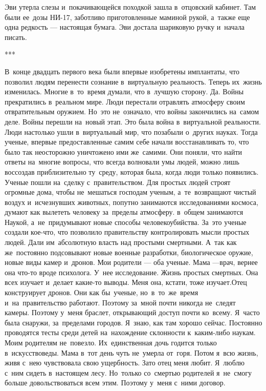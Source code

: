 Эви утерла слезы и~покачивающейся походкой зашла в~отцовский кабинет.
Там были ее~дозы НИ-17, заботливо приготовленные маминой рукой, а~также еще одна редкость --- настоящая бумага.
Эви достала шариковую ручку и~начала писать.
 
 \begin{center}
 	***
 \end{center}
 
 
В~конце двадцать первого века были впервые изобретены имплантаты, что позволил людям перенести сознание в~виртуальную реальность.
Теперь их~жизнь изменилась.
Многие в~то~время думали, что в~лучшую сторону.
Да.
Войны прекратились в~реальном мире.
Люди перестали отравлять атмосферу своим отвратительным оружием.
Но~это не~означало, что войны закончились на~самом деле.
Войны перешли на~новый этап.
Это была война в~виртуальной реальности.
Люди настолько ушли в~виртуальный мир, что позабыли о~других науках.
Тогда ученые, впервые предоставленные самим себе начали восстанавливать то, что было так неосторожно уничтожено ими же~самими.
Они поняли, что найти ответы на~многие вопросы, что всегда волновали умы людей, можно лишь воссоздав приблизительно ту~среду, которая была, когда люди только появились.
Ученые пошли на~сделку с~правительством.
Для простых людей строят огромные дома, чтобы не~мешаться господам ученым, а~те~возвращают чистый воздух и~исчезнувших животных, попутно занимаются исследованиями космоса, думают как вылететь человеку за~пределы атмосферу.
в~общем занимаются Наукой, а~не~придумывают новые способы человекоубийства.
За~это ученые создали кое-что, что позволило правительству контролировать мысли простых людей.
Дали им~абсолютную власть над простыми смертными.
А~так как же~постоянно подсовывают новые военные разработки, биологическое оружие, новые виды камер и~дронов.
Мои родители --- оба ученые.
Мама ---врач, вернее она что-то вроде психолога.
У~нее исследование.
Жизнь простых смертных.
Она всех изучает и~делает какие-то выводы.
Меня она, кстати, тоже изучает.Отец конструирует дронов.
Они как бы~ученые, но~в~то~же~время и~на~правительство работают.
Поэтому за~мной почти никогда не~следят камеры.
Поэтому у~меня браслет, открывающий доступ почти ко~всему.
Я~часто была снаружи, за~пределами городов.
Я~знаю, как там хорошо сейчас.
Постоянно проводятся тесты среди детей на~нахождение склонности к~каким-либо наукам.
Моим родителям не~повезло.
Их~единственная дочь годится только в~искусствоведы.
Мама в~тот день чуть не~умерла от~горя.
Потом я~всю жизнь, живя с~нею чувствовала свою ущербность.
Зато отец меня любит.
Я~люблю с~ним сидеть в~настоящем лесу.
Но~только со~смертью родителей я~не~смогу больше довольствоваться всем этим.
Поэтому у~меня с~ними договор.

